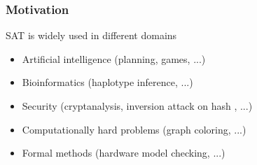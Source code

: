 \documentclass{beamer}
\begin{document}
\begin{frame}

\frametitle{Motivation}
SAT is widely used in different domains

\begin{itemize}
	\item Artificial intelligence (planning, games, ...)
	\item Bioinformatics (haplotype inference, ...)
	\item Security (cryptanalysis, inversion attack on hash , ...)
	\item Computationally hard problems (graph coloring, ...)
	\item Formal methods (hardware model checking, ...)
\end{itemize}

\end{frame}
\end{document}
